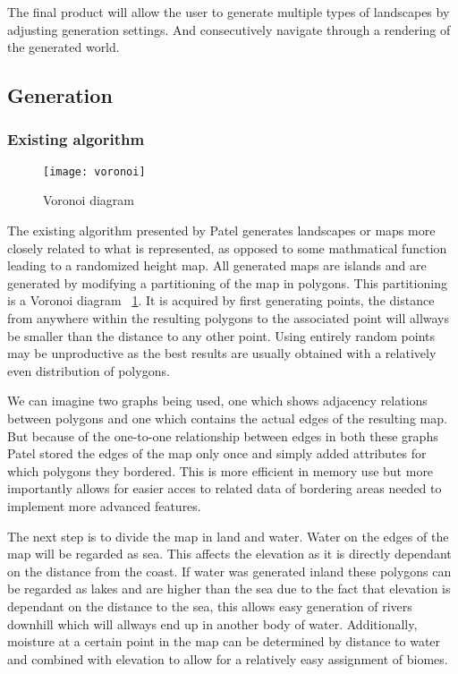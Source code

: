 The final product will allow the user to generate multiple types of landscapes by adjusting generation settings. And consecutively navigate through a rendering of the generated world. 

\subsection{Generation}

\subsubsection{Existing algorithm}

\begin{figure}[H]
	\centering
	\texttt{[image: voronoi]}
	\caption{Voronoi diagram}
	\label{fig:voronoi}
\end{figure}

The existing algorithm presented by Patel\cite{redblob} generates landscapes or maps more closely related to what is represented, as opposed to some mathmatical function leading to a randomized height map. All generated maps are islands and are generated by modifying a partitioning of the map in polygons. This partitioning is a Voronoi diagram ~\ref{fig:voronoi}. It is acquired by first generating points, the distance from anywhere within the resulting polygons to the associated point will allways be smaller than the distance to any other point. Using entirely random points may be unproductive as the best results are usually obtained with a relatively even distribution of polygons.

We can imagine two graphs being used, one which shows adjacency relations between polygons and one which contains the actual edges of the resulting map. But because of the one-to-one relationship between edges in both these graphs Patel\cite{redblob} stored the edges of the map only once and simply added attributes for which polygons they bordered. This is more efficient in memory use but more importantly allows for easier acces to related data of bordering areas needed to implement more advanced features.

The next step is to divide the map in land and water. Water on the edges of the map will be regarded as sea. This affects the elevation as it is directly dependant on the distance from the coast. If water was generated inland these polygons can be regarded as lakes and are higher than the sea due to the fact that elevation is dependant on the distance to the sea, this allows easy generation of rivers downhill which will allways end up in another body of water. Additionally, moisture at a certain point in the map can be determined by distance to water and combined with elevation to allow for a relatively easy assignment of biomes.

